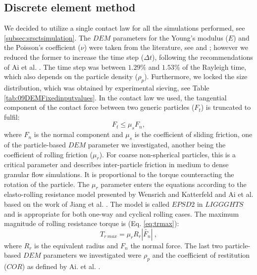 \documentclass{llncs}
\begin{document}
\subsection{Discrete element method}
\label{subsec:dem}

We decided to utilize a single
contact law for all the simulations performed, see
\ref{subsec:srsctsimulation}.
The $DEM$ parameters for the Young's modulus ($E$) and the Poisson's coefficient
($\nu$) were taken from the literature, see \cite{RefWorks:175} 
and \cite{RefWorks:176}; however we reduced the former to increase the time step
($\Delta t$), following the recommendations of Ai et al. \cite{RefWorks:131}.
The time step was between $1.29 \%$ and $1.53 \%$ of the Rayleigh time, which
also depends on the particle density ($\rho_p$).
Furthermore, we locked the size distribution, which was obtained by experimental
sieving, see Table \ref{tab:09DEMFixedinputvalues}.
In the contact law we used, 
the tangential component of the contact force between two generic particles
($F_t$) is truncated to fulfil:
\begin{equation}
F_{t} \leq \mu_s F_{n},
 \label{eq:force_t}
\end{equation}
where $F_n$ is the normal component and $\mu_s$ is the coefficient of sliding
friction, one of the particle-based $DEM$ parameter we investigated, 
another being the coefficient of rolling friction ($\mu_r$). 
For coarse non-spherical particles, this is a critical parameter and describes
inter-particle friction in medium to dense granular flow simulations. It is proportional to the 
torque counteracting the rotation of the particle. The $\mu_r$ parameter enters the 
equations according to the elasto-rolling resistance model presented by Wensrich and 
Katterfeld \cite{RefWorks:87} and Ai et al. \cite{RefWorks:131} 
based on the work of Jiang et al. \cite{RefWorks:143}. 
The model is called $EPSD2$ in $LIGGGHTS$ and is appropriate for both one-way and cyclical rolling cases.
The maximum magnitude of rolling resistance torque is (Eq. \ref{eq:trmax}):
\begin{equation}
T_{r~max} = \mu_r R_r |\tilde{F_n}| ~,
 \label{eq:trmax}
\end{equation}
where $R_r$ is the equivalent radius and $F_n$ the normal force.
The last two particle-based $DEM$ parameters we investigated were $\rho_p$
and the coefficient of restitution ($COR$) as defined by Ai. et al. \cite{RefWorks:131}.
\end{document}
